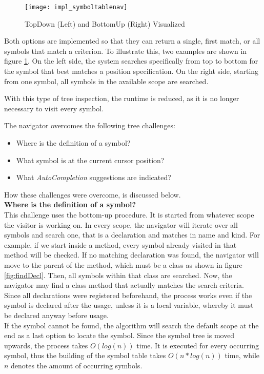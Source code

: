 \begin{figure}[H]
    \centering
    \texttt{[image: impl\_symboltablenav]}
    \caption{TopDown (Left) and BottomUp (Right) Visualized}
    \label{fig:impl_symboltablenav}
\end{figure}

Both options are implemented so that they can return a single, first match, or all symbols that match a criterion.
To illustrate this, two examples are shown in figure \ref{fig:impl_symboltablenav}.
On the left side, the system searches specifically from top to bottom for the symbol that best matches a position specification. On the right side, starting from one symbol, all symbols in the available scope are searched.

With this type of tree inspection, the runtime is reduced, as it is no longer necessary to visit every symbol.

The navigator overcomes the following tree challenges:
\begin{itemize}
    \item Where is the definition of a symbol?
    \item What symbol is at the current cursor position?
    \item What \textit{AutoCompletion} suggestions are indicated?
\end{itemize}
How these challenges were overcome, is discussed below. \\

\textbf{Where is the definition of a symbol?}\\
This challenge uses the bottom-up procedure.
It is started from whatever scope the visitor is working on.
In every scope, the navigator will iterate over all symbols and search one, that is a declaration and matches in name and kind.
For example, if we start inside a method, every symbol already visited in that method will be checked.
If no matching declaration was found, the navigator will move to the parent of the method, which must be a class
as shown in figure \ref{fig:findDecl}.
Then, all symbols within that class are searched.
Now, the navigator may find a class method that actually matches the search criteria.
Since all declarations were registered beforehand,
the process works even if the symbol is declared after the usage,
unless it is a local variable,
whereby it must be declared anyway before usage.\\

If the symbol cannot be found, the algorithm will search the default scope at the end as a last option to locate the symbol.
Since the symbol tree is moved upwards, the process takes $O(log(n))$ time.
It is executed for every occurring symbol, thus the building of the symbol table takes $O(n*log(n))$ time, while $n$ denotes the amount of occurring symbols.\\

